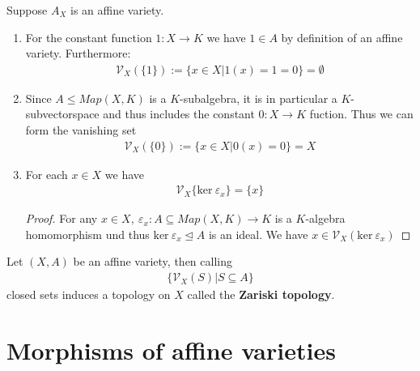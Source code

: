 \documentclass[]{article}
\begin{document}
\begin{example}
    Suppose \(A_X\) is an affine variety. 
    \begin{enumerate}
        \item For the constant function \(1: X \rightarrow K\) we have \(1 \in A\) by definition of an affine variety. Furthermore:
        \begin{align*}
            \mathcal{V}_X(\{1\}):= \{x \in X| 1(x) = 1= 0\} = \emptyset
        \end{align*}
        \item Since \(A \leq Map(X,K)\) is a \(K\)-subalgebra, it is in particular a \(K\)-subvectorspace and thus includes the constant
        \(0: X \rightarrow K\) fuction. Thus we can form the vanishing set 
        \begin{align*}
            \mathcal{V}_X(\{0\}) := \{ x \in X | 0(x)=0\} = X
        \end{align*}
        \item For each \( x \in X\) we have 
        \begin{align*}
            \mathcal{V}_X\{\text{ker} \ \varepsilon_x\} = \{x\}
        \end{align*}
        \begin{proof}
            For any \(x \in X , \ \varepsilon_x: A \subseteq Map(X, K) \rightarrow K \) is a \(K\)-algebra homomorphism und 
            thus \(\text{ker} \ \varepsilon_x \trianglelefteq A\) is an ideal. We have \(x \in \mathcal{V}_X(\text{ker} \ \varepsilon_x)\)
        \end{proof}
    \end{enumerate}
\end{example}

\setcounter{theorem}{10}
\begin{definition}
    Let \((X,A)\) be an affine variety, then calling
    \begin{align*}
        \{\mathcal{V}_X(S) | S \subseteq A\}
    \end{align*}
    closed sets induces a topology on \(X\) called the \textbf{Zariski topology}.
\end{definition}


\setcounter{section}{2}
\section{Morphisms of affine varieties}
\end{document}
